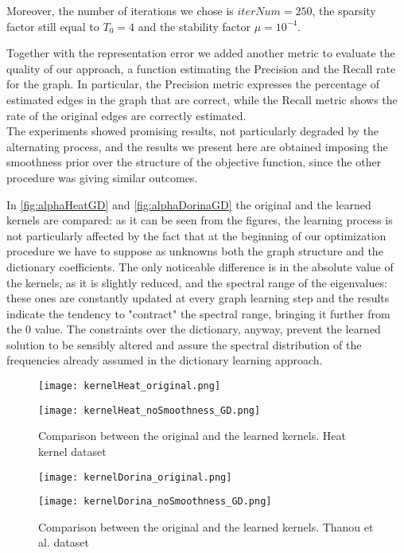 Moreover, the number of iterations we chose is $iterNum = 250$, the sparsity factor still equal to $T_0 = 4$ and the stability factor $\mu = 10^{-4}$.

Together with the representation error we added another metric to evaluate the quality of our approach, a function estimating the Precision and the Recall rate for the graph. In particular, the Precision metric expresses the percentage of estimated edges in the graph that are correct, while the Recall metric shows the rate of the original edges are correctly estimated.\\
The experiments showed promising results, not particularly degraded by the alternating process, and the results we present here are obtained imposing the smoothness prior over the structure of the objective function, since the other procedure was giving similar outcomes.

In \autoref{fig:alphaHeatGD} and \autoref{fig:alphaDorinaGD} the original and the learned kernels are compared: as it can be seen from the figures, the learning process is not particularly affected  by the fact that at the beginning of our optimization procedure we have to suppose as unknowns both the graph structure and the dictionary coefficients. The only noticeable difference is in the absolute value of the kernels, as it is slightly reduced, and the spectral range of the eigenvalues: these ones are constantly updated at every graph learning step and the results indicate the tendency to "contract" the spectral range, bringing it further from the 0 value. The constraints over the dictionary, anyway, prevent the learned solution to be sensibly altered and assure the spectral distribution of the frequencies already assumed in the dictionary learning approach.

\begin{figure}[hb]
  \begin{minipage}[c]{.5\textwidth}
    \centering
    \texttt{[image: kernelHeat\_original.png]}
  \end{minipage}
  \begin{minipage}[c]{.5\textwidth}
    \centering
    \texttt{[image: kernelHeat\_noSmoothness\_GD.png]}
  \end{minipage}
  \caption{Comparison between the original and the learned kernels. Heat kernel dataset}
  \label{fig:alphaHeatGD}
\end{figure}

\begin{figure}[ht]
  \begin{minipage}[c]{.5\textwidth}
    \centering
    \texttt{[image: kernelDorina\_original.png]}
  \end{minipage}
  \begin{minipage}[c]{.5\textwidth}
    \centering
    \texttt{[image: kernelDorina\_noSmoothness\_GD.png]}
  \end{minipage}
  \caption{Comparison between the original and the learned kernels. Thanou et al. dataset}
  \label{fig:alphaDoriaGD}
\end{figure}

